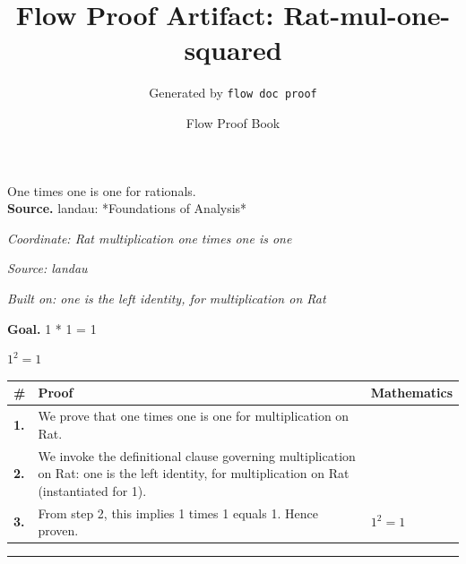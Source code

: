 \documentclass[11pt]{article}
\title{Flow Proof Artifact: Rat-mul-one-squared}
\author{Generated by \texttt{flow doc proof}}
\date{Flow Proof Book}
\theoremstyle{definition}
\begin{document}
\maketitle
One times one is one for rationals.\\[0.5em]
\textbf{Source.} landau: *Foundations of Analysis*\\[0.5em]
\bigskip
{}\par
\smallskip\noindent\textit{Coordinate: Rat \cdot multiplication \cdot one times one is one}\par
\smallskip\noindent\textit{Source: landau}\par
\smallskip\noindent\textit{Built on: one is the left identity, for multiplication on Rat}\par
\medskip
\noindent\textbf{Goal.} 1 * 1 = 1\par
\noindent$\displaystyle 1^{2} = 1$\par
\medskip
\noindent
\begin{tabular}{@{} >{\raggedright\arraybackslash}p{} >{\raggedright\arraybackslash}p{} >{\raggedleft\arraybackslash}p{} @{}}
\textbf{\#} & \textbf{Proof} & \textbf{Mathematics} \\
\midrule
\textbf{1.} & We prove that one times one is one for multiplication on Rat. & \\[0.45em]
\textbf{2.} & We invoke the definitional clause governing multiplication on Rat: one is the left identity, for multiplication on Rat (instantiated for 1). & \\[0.45em]
\textbf{3.} & From step 2, this implies 1 times 1 equals 1. Hence proven. & $\displaystyle 1^{2} = 1$ \\[0.45em]
\bottomrule
\end{tabular}
\label{thm:Rat-multiplication-one_times_one_is_one}
\par\medskip\hrule
\end{document}
